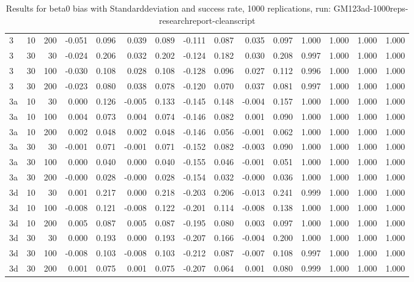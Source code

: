 \begin{table}[ht]
\begin{tabular}{lrrrrrrrrrrrrrr}
  3 & 10 & 200 & -0.051 & 0.096 & 0.039 & 0.089 & -0.111 & 0.087 & 0.035 & 0.097 & 1.000 & 1.000 & 1.000 & 1.000 \\ 
  3 & 30 & 30 & -0.024 & 0.206 & 0.032 & 0.202 & -0.124 & 0.182 & 0.030 & 0.208 & 0.997 & 1.000 & 1.000 & 1.000 \\ 
  3 & 30 & 100 & -0.030 & 0.108 & 0.028 & 0.108 & -0.128 & 0.096 & 0.027 & 0.112 & 0.996 & 1.000 & 1.000 & 1.000 \\ 
  3 & 30 & 200 & -0.023 & 0.080 & 0.038 & 0.078 & -0.120 & 0.070 & 0.037 & 0.081 & 0.997 & 1.000 & 1.000 & 1.000 \\ 
  3a & 10 & 30 & 0.000 & 0.126 & -0.005 & 0.133 & -0.145 & 0.148 & -0.004 & 0.157 & 1.000 & 1.000 & 1.000 & 1.000 \\ 
  3a & 10 & 100 & 0.004 & 0.073 & 0.004 & 0.074 & -0.146 & 0.082 & 0.001 & 0.090 & 1.000 & 1.000 & 1.000 & 1.000 \\ 
  3a & 10 & 200 & 0.002 & 0.048 & 0.002 & 0.048 & -0.146 & 0.056 & -0.001 & 0.062 & 1.000 & 1.000 & 1.000 & 1.000 \\ 
  3a & 30 & 30 & -0.001 & 0.071 & -0.001 & 0.071 & -0.152 & 0.082 & -0.003 & 0.090 & 1.000 & 1.000 & 1.000 & 1.000 \\ 
  3a & 30 & 100 & 0.000 & 0.040 & 0.000 & 0.040 & -0.155 & 0.046 & -0.001 & 0.051 & 1.000 & 1.000 & 1.000 & 1.000 \\ 
  3a & 30 & 200 & -0.000 & 0.028 & -0.000 & 0.028 & -0.154 & 0.032 & -0.000 & 0.036 & 1.000 & 1.000 & 1.000 & 1.000 \\ 
  3d & 10 & 30 & 0.001 & 0.217 & 0.000 & 0.218 & -0.203 & 0.206 & -0.013 & 0.241 & 0.999 & 1.000 & 1.000 & 1.000 \\ 
  3d & 10 & 100 & -0.008 & 0.121 & -0.008 & 0.122 & -0.201 & 0.114 & -0.008 & 0.138 & 1.000 & 1.000 & 1.000 & 1.000 \\ 
  3d & 10 & 200 & 0.005 & 0.087 & 0.005 & 0.087 & -0.195 & 0.080 & 0.003 & 0.097 & 1.000 & 1.000 & 1.000 & 1.000 \\ 
  3d & 30 & 30 & 0.000 & 0.193 & 0.000 & 0.193 & -0.207 & 0.166 & -0.004 & 0.200 & 1.000 & 1.000 & 1.000 & 1.000 \\ 
  3d & 30 & 100 & -0.008 & 0.103 & -0.008 & 0.103 & -0.212 & 0.087 & -0.007 & 0.108 & 0.997 & 1.000 & 1.000 & 1.000 \\ 
  3d & 30 & 200 & 0.001 & 0.075 & 0.001 & 0.075 & -0.207 & 0.064 & 0.001 & 0.080 & 0.999 & 1.000 & 1.000 & 1.000 \\ 
   \hline
\end{tabular}
\caption{Results for beta0 bias with Standarddeviation and success rate, 1000 replications, run: GM123ad-1000reps-researchreport-cleanscript} 
\label{tab:beta0_bias_sd_success}
\end{table}
